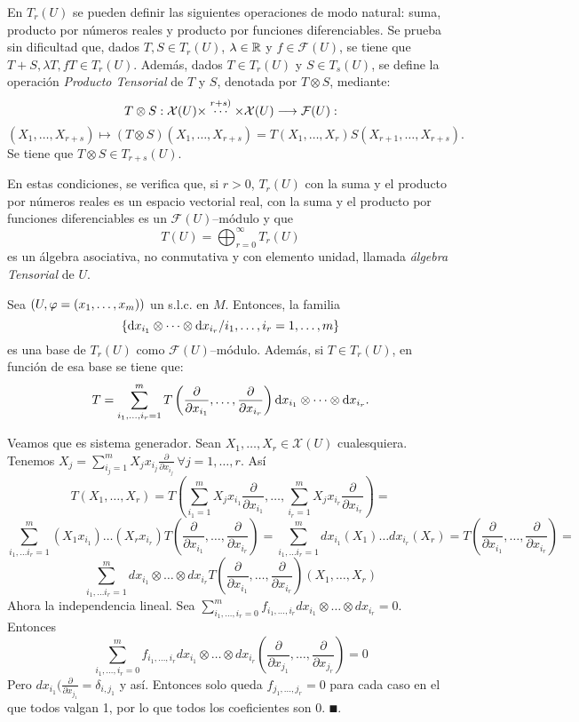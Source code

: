 \documentclass[cursovd_portada.tex]{subfiles}
\begin{document}
En $T_r(U)$ se pueden definir las siguientes operaciones de modo natural: suma, producto por números reales y
producto por funciones diferenciables. Se prueba sin dificultad que, dados $T,S\in T_r(U)$, $\lambda\in\mathbb{R}$ y
$f\in\mathcal{F}(U)$, se tiene que $T+S,\lambda T,fT\in T_r(U)$. Además, dados $T\in T_r(U)$ y $S\in T_s(U)$, se
define la operación {\it Producto Tensorial} de $T$ y $S$, denotada por $T\otimes S$, mediante:
$$T\otimes S:{\cal X}(U)\times\stackrel{r+s)}\cdots\times\mathcal{X}(U)\longrightarrow\mathcal{F}(U):$$
$$(X_1,\dots ,X_{r+s})\mapsto(T\otimes S)(X_1,\dots ,X_{r+s})=T(X_1,\dots ,X_r)S(X_{r+1},\dots ,X_{r+s}).$$
\hs Se tiene que $T\otimes S\in T_{r+s}(U)$.
\par
En estas condiciones, se verifica que, si $r>0$, $T_r(U)$ con la suma y el producto por números reales es un
espacio vectorial real, con la suma y el producto por funciones diferenciables es un $\mathcal{F}(U)$--módulo y
que
$$T(U)=\bigoplus_{r=0}^{\infty}T_r(U)$$
es un álgebra asociativa, no conmutativa y con elemento unidad, llamada {\it álgebra Tensorial} de $U$.
\begin{prop}
Sea $(U,\varphi=(x_1,\dots ,x_m))$ un s.l.c. en $M$. Entonces, la familia
$$\{{\rm d} x_{i_1}\otimes\cdots\otimes{\rm d} x_{i_r}/i_1,\dots ,i_r=1,\dots ,m\}$$
es una base de $T_r(U)$ como $\mathcal{F}(U)$--módulo. Además, si $T\in T_r(U)$, en función de esa base se tiene
que:
$$T=\sum_{i_1,\dots ,i_r=1}^mT\left(\displaystyle{\frac{\partial}{\partial x_{i_1}}},\dots
,\displaystyle{\frac{\partial}{\partial x_{i_r}}}\right){\rm d} x_{i_1}\otimes\cdots\otimes{\rm d} x_{i_r}.$$
\end{prop}
\begin{dem}
Veamos que es sistema generador. Sean $X_1,\dots, X_r\in\mathcal{X}(U)$ cualesquiera. Tenemos $X_j=\sum_{i_j=1}^mX_jx_{i_j}\frac{\partial}{\partial x_{i_j}}\ \forall j=1,\dots,r$. Así
$$T(X_1,\dots,X_r)=T(\sum_{i_1=1}^mX_jx_{i_1}\frac{\partial}{\partial x_{i_1}},\dots,\sum_{i_r=1}^mX_jx_{i_r}\frac{\partial}{\partial x_{i_r}})=$$
$$\sum_{i_1,\dots i_r=1}^m(X_1x_{i_1})\dots(X_rx_{i_r})T(\frac{\partial}{\partial x_{i_1}},\dots,\frac{\partial}{\partial x_{i_r}})=\sum_{i_1,\dots i_r=1}^mdx_{i_1}(X_1)\dots dx_{i_r}(X_r)=T(\frac{\partial}{\partial x_{i_1}},\dots,\frac{\partial}{\partial x_{i_r}})=$$
$$\sum_{i_1,\dots i_r=1}^mdx_{i_1}\otimes\dots\otimes dx_{i_r}T(\frac{\partial}{\partial x_{i_1}},\dots,\frac{\partial}{\partial x_{i_r}})(X_1,\dots,X_r)$$
Ahora la independencia lineal. Sea $\sum_{i_1,\dots,i_r=0}^m f_{i_1,\dots, i_r}dx_{i_1}\otimes\dots\otimes dx_{i_r}=0$. Entonces 
$$\sum_{i_1,\dots,i_r=0}^m f_{i_1,\dots, i_r}dx_{i_1}\otimes\dots\otimes dx_{i_r}(\frac{\partial}{\partial x_{j_1}},\dots,\frac{\partial}{\partial x_{j_r}})=0$$
Pero $dx_{i_1}(\frac{\partial }{\partial x_{j_1}}=\delta_{i,j_1}$ y así. Entonces solo queda $f_{j_1,\dots,j_r}=0$ para cada caso en el que todos valgan 1, por lo que todos los coeficientes son 0. $\QED$. 
\end{dem}
\end{document}
